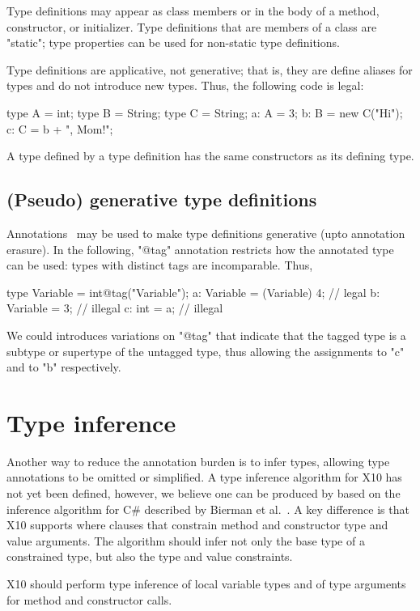 \documentclass{llncs}
\begin{document}
Type definitions may appear as class members or in the body of a
method, constructor, or initializer.  Type definitions that are
members of a class are \xcd"static"; type properties can be used
for non-static type definitions.

Type definitions are applicative, not generative; that is, they
are define aliases for types and do not introduce new types.
Thus, the following code is legal:
\begin{xten}
type A = int;
type B = String;
type C = String;
a: A = 3;
b: B = new C("Hi");
c: C = b + ", Mom!";
\end{xten}
A type defined by a type definition 
has the same constructors as its defining type.

\subsection{(Pseudo) generative type definitions}

Annotations~\cite{ns07-x10anno} may be used to make type definitions
generative (upto annotation erasure).  In the following, \xcd"@tag"
annotation restricts how the annotated type can be used: types
with distinct tags are incomparable.
Thus,
\begin{xten}
type Variable = int@tag("Variable");
a: Variable = (Variable) 4; // legal
b: Variable = 3; // illegal
c: int = a; // illegal
\end{xten}
We could introduces variations on \xcd"@tag" that
indicate that the tagged type is a subtype or supertype of the
untagged type, thus allowing the assignments to \xcd"c"
and to \xcd"b" respectively.

\fi


\section{Type inference}

Another way to reduce the annotation burden is to infer types,
allowing type annotations to be omitted or simplified.
A type inference algorithm for X10 has not yet been defined,
however, we believe one can be produced by
based on the inference algorithm 
for C\# described by Bierman et al.~\cite{csharp3}.
A key difference is that X10 supports where clauses that
constrain method and constructor type and value arguments.
The algorithm should infer not only the base type of a
constrained type, but also the type and value constraints.

X10 should perform type inference of local variable
types and of type arguments for method and constructor calls.%
\end{document}

